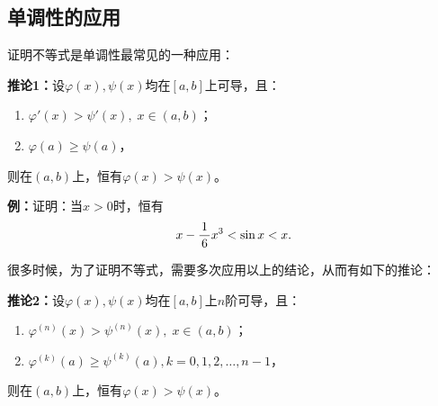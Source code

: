 \subsection{单调性的应用}

证明不等式是单调性最常见的一种应用：

\begin{thx}
	{\bf 推论1：}设$\varphi(x),\psi(x) $均在$[a,b]$上可导，且：
	\begin{enumerate}[(1)]
	  \item $\varphi'(x)>\psi'(x),\;x\in(a,b)$；
	  \item $\varphi(a)\geq\psi(a)$，
	\end{enumerate}
	则在$(a,b)$上，恒有$\varphi(x)>\psi(x)$。
\end{thx}

{\bf 例：}证明：当$x>0$时，恒有
$$x-\displaystyle\frac{\,{1}\,}{\,{6}\,}x^3<\sin x<x.$$

\begin{center}
\end{center}

很多时候，为了证明不等式，需要多次应用以上的结论，从而有如下的推论：

\begin{thx}
	{\bf 推论2：}设$\varphi(x),\psi(x) $均在$[a,b]$上$n$阶可导，且：
	\begin{enumerate}[(1)]
	  \item $\varphi^{(n)}(x)>\psi^{(n)}(x),\;x\in(a,b)$；
	  \item $\varphi^{(k)}(a)\geq\psi^{(k)}(a),k=0,1,2,\ldots,n-1$，
	\end{enumerate}
	则在$(a,b)$上，恒有$\varphi(x)>\psi(x)$。
\end{thx}


